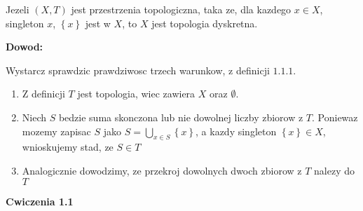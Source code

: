 \documentclass{article}
\begin{document}
\begin{tcolorbox}[colback=white!90!green,colframe=black!35!green,title=1.1.9 Lemat: Topologia dyskretna i singletony]

Jezeli $(X,T)$ jest przestrzenia topologiczna, taka ze, dla kazdego $x \in X$, singleton $x$, $\left\{x\right\}$ jest w $X$, to $X$ jest topologia dyskretna.

\end{tcolorbox}
\textbf{Dowod:}

Wystarcz sprawdzic prawdziwosc trzech warunkow, z definicji $1.1.1$.
\begin{enumerate}
\item Z definicji $T$ jest topologia, wiec zawiera $X$ oraz $\emptyset$.
\item Niech $S$ bedzie suma skonczona lub nie dowolnej liczby zbiorow z $T$. Poniewaz mozemy zapisac $S$ jako $S = \bigcup\limits_{x \in S}\left\{x\right\}$, a kazdy singleton $\left\{x\right\} \in X$, wnioskujemy stad, ze $S \in T$ 
\item Analogicznie dowodzimy, ze przekroj dowolnych dwoch zbiorow z $T$ nalezy do $T$
\end{enumerate}

\hrulefill

\textbf{Cwiczenia 1.1}
\end{document}
